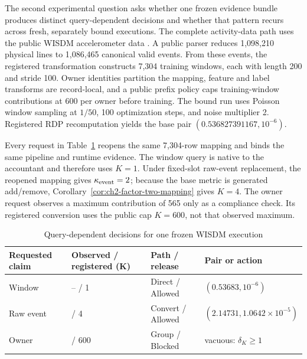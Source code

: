 The second experimental question asks whether one frozen evidence bundle produces
distinct query-dependent decisions and whether that pattern recurs across fresh,
separately bound executions.  The complete activity-data path uses the public
WISDM accelerometer data \cite{kwapisz2011activity}.  A public parser reduces
1,098,210 physical lines to 1,086,465 canonical valid events.  From these events,
the registered transformation constructs 7,304 training windows, each with length
200 and stride 100.  Owner identities partition the mapping, feature and label transforms
are record-local, and a public prefix policy caps training-window contributions at
600 per owner before training.  The bound run uses Poisson window sampling at
\(1/50\), 100 optimization steps, and noise multiplier 2.  Registered RDP
recomputation yields the base pair
\((0.536827391167,10^{-6})\).

Every request in Table~\ref{tab:ch2-wisdm-query-decisions} reopens the same
7,304-row mapping and binds the same pipeline and runtime evidence.  The window
query is native to the accountant and therefore uses \(K=1\).  Under fixed-slot
raw-event replacement, the reopened mapping gives
\(\kappa_{\mathrm{event}}=2\); because the base metric is generated add/remove,
Corollary~\ref{cor:ch2-factor-two-mapping} gives \(K=4\).  The owner request
observes a maximum contribution of 565 only as a compliance check.  Its registered
conversion uses the public cap \(K=600\), not that observed maximum.

\begin{table}[tbp]
    \centering
    \caption{Query-dependent decisions for one frozen WISDM execution}
    \label{tab:ch2-wisdm-query-decisions}
    \small
    \setlength{\tabcolsep}{3pt}
    \renewcommand{\arraystretch}{1.15}
    \begin{tabular}{@{}
        >{\raggedright\arraybackslash}p{}
        >{\centering\arraybackslash}p{}
        >{\raggedright\arraybackslash}p{}
        >{\raggedright\arraybackslash}p{}@{}}
        \toprule
        \textbf{Requested claim} &
        \textbf{Observed / registered (K)} &
        \textbf{Path / release} &
        \textbf{Pair or action} \\
        \midrule
        Window &
        -- / 1 &
        \textsf{Direct} / \textsf{Allowed} &
        \((0.53683,10^{-6})\) \\

        Raw event &
        2 / 4 &
        \textsf{Convert} / \textsf{Allowed} &
        \((2.14731,1.0642\times10^{-5})\) \\

        Owner &
        565 / 600 &
        \textsf{Group} / \textsf{Blocked} &
        vacuous: \(\delta_K\geq1\) \\
        \bottomrule
    \end{tabular}
\end{table}


